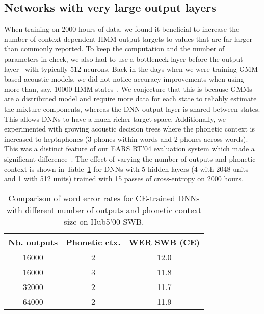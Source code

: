 \documentclass[a4paper]{article}
\begin{document}
\subsection{Networks with very large output layers}
\label{vlol}

When training on 2000 hours of data, we found it beneficial to
increase the number of context-dependent HMM output targets to values
that are far larger than commonly reported. To keep the computation
and the number of parameters in check, we also had to use a bottleneck
layer before the output layer~\cite{sainath13} with typically 512
neurons. Back in the days when we were training GMM-based acoustic
models, we did not notice accuracy improvements when using more than,
say, 10000 HMM states~\cite{soltau05}. We conjecture that this is
because GMMs are a distributed model and require more data for each
state to reliably estimate the mixture components, whereas the DNN
output layer is shared between states. This allows DNNs to have a much
richer target space. Additionally, we experimented with growing
acoustic decision trees where the phonetic context is increased to
heptaphones (3 phones within words and 2 phones across
words). This was a distinct feature of our EARS RT'04 evaluation
system which made a significant difference~\cite{soltau05}. The effect of
varying the number of outputs and phonetic context is shown in
Table~\ref{vlol-tab} for DNNs with 5 hidden layers (4 with 2048 units
and 1 with 512 units) trained with 15 passes of cross-entropy on 2000 hours.

\begin{table}[htpb!]
\begin{center}
\begin{tabular}{|c|c|c|} \hline
Nb. outputs  & Phonetic ctx. & WER SWB (CE)\\ \hline 
16000        & 2        & 12.0 \\ 
16000        & 3        & 11.8 \\ \hline
32000        & 2        & 11.7 \\ \hline
64000        & 2        & 11.9 \\ \hline
\end{tabular}
\end{center}
\caption{\label{vlol-tab}
Comparison of word error rates for CE-trained DNNs with different number of outputs and phonetic context size on Hub5'00 SWB.}
\end{table}
\end{document}
